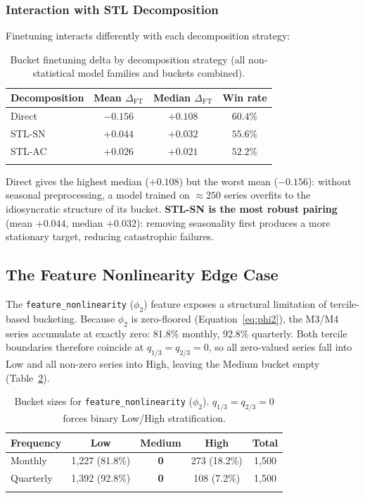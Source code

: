 \documentclass[pdflatex,sn-mathphys-num]{sn-jnl}
\theoremstyle{thmstyleone}
\theoremstyle{thmstyletwo}
\theoremstyle{thmstylethree}
\begin{document}
\subsubsection{Interaction with STL Decomposition}\label{sec:ft_stl_interact}

Finetuning interacts differently with each decomposition strategy:

\begin{table}[ht]
\caption{Bucket finetuning delta by decomposition strategy (all non-statistical
model families and buckets combined).}\label{tab:ft_decomp}
\begin{tabular}{lccc}
\toprule
Decomposition & Mean $\Delta_{\mathrm{FT}}$ & Median $\Delta_{\mathrm{FT}}$ & Win rate \\
\midrule
Direct   & $-0.156$ & $+0.108$ & $60.4\%$ \\
STL-SN   & $+0.044$ & $+0.032$ & $55.6\%$ \\
STL-AC   & $+0.026$ & $+0.021$ & $52.2\%$ \\
\botrule
\end{tabular}
\end{table}

\noindent
Direct gives the highest median ($+0.108$) but the worst mean ($-0.156$):
without seasonal preprocessing, a model trained on $\approx\!250$ series
overfits to the idiosyncratic structure of its bucket.
\textbf{STL-SN is the most robust pairing} (mean $+0.044$, median $+0.032$):
removing seasonality first produces a more stationary target, reducing
catastrophic failures.

\subsection{The Feature Nonlinearity Edge Case}\label{sec:nonlin_edge}

The \texttt{feature\_nonlinearity} ($\phi_2$) feature exposes a structural
limitation of tercile-based bucketing.
Because $\phi_2$ is zero-floored (Equation~\ref{eq:phi2}), the M3/M4 series
accumulate at exactly zero: 81.8\% monthly, 92.8\% quarterly.
Both tercile boundaries therefore coincide at $q_{1/3} = q_{2/3} = 0$, so all
zero-valued series fall into Low and all non-zero series into High, leaving the
Medium bucket empty (Table~\ref{tab:nonlin_buckets}).

\begin{table}[ht]
\caption{Bucket sizes for \texttt{feature\_nonlinearity} ($\phi_2$).
$q_{1/3} = q_{2/3} = 0$ forces binary Low/High stratification.}\label{tab:nonlin_buckets}
\begin{tabular}{lcccc}
\toprule
Frequency & Low & Medium & High & Total \\
\midrule
Monthly   & 1{,}227 (81.8\%) & \textbf{0} & 273 (18.2\%) & 1{,}500 \\
Quarterly & 1{,}392 (92.8\%) & \textbf{0} & 108 (7.2\%)  & 1{,}500 \\
\botrule
\end{tabular}
\end{table}
\end{document}
